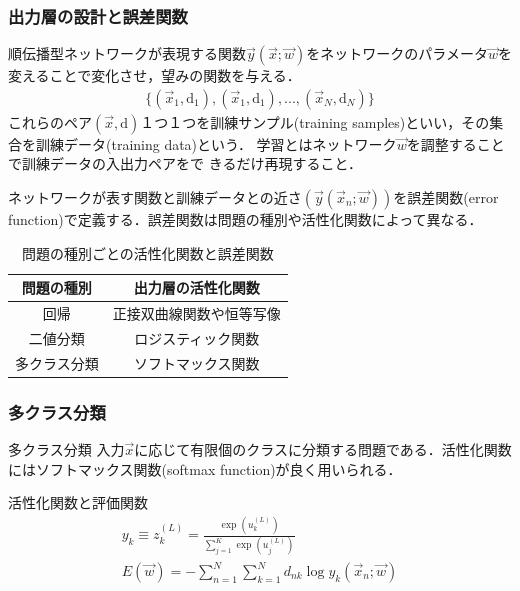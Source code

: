 \documentclass[dvipdfmx,11pt,notheorems]{beamer}
\theoremstyle{definition}
\begin{document}
\begin{frame}[fragile]\frametitle{出力層の設計と誤差関数}

順伝播型ネットワークが表現する関数$\vec{y}(\vec{x};\vec{w})$をネットワークのパラメータ$\vec{w}$を変えることで変化させ，望みの関数を与える．
\begin{eqnarray}
 \{(\vec{x}_{1},\mathrm{d}_{1}),(\vec{x}_{1},\mathrm{d}_{1}),...,(\vec{x}_{N},\mathrm{d}_{N})\}
\end{eqnarray}
これらのペア$(\vec{x},\mathrm{d})$１つ１つを訓練サンプル(training samples)といい，その集合を訓練データ(training data)という．
学習とはネットワーク$\vec{w}$を調整することで訓練データの入出力ペアをで
 きるだけ再現すること．

ネットワークが表す関数と訓練データとの近さ$(\vec{y}(\vec{x}_{n};\vec{w}))$を誤差関数(error function)で定義する．誤差関数は問題の種別や活性化関数によって異なる．

\begin{table}[htb]
\centering
\caption{問題の種別ごとの活性化関数と誤差関数}
\label{000718_27Jun15}
\begin{tabular}[bt]{|c|c|}\hline
 問題の種別 & 出力層の活性化関数 \\ \hline \hline
 回帰 & 正接双曲線関数や恒等写像\\
 二値分類 & ロジスティック関数\\
 多クラス分類 & ソフトマックス関数\\ \hline
\end{tabular}
\end{table}
\end{frame}


\begin{frame}[fragile]\frametitle{多クラス分類}
\begin{block}{多クラス分類}
入力$\vec{x}$に応じて有限個のクラスに分類する問題である．活性化関数にはソフトマックス関数(softmax function)が良く用いられる．
\end{block}
\begin{exampleblock}{活性化関数と評価関数}
\begin{eqnarray}
 y_{k} \equiv z_{k}^{(L)}= \frac{\exp(u_{k}^{(L)})}{\sum^{K}_{j=1}\exp(u_{j}^{(L)})} \\
E(\vec{w})=-\sum^{N}_{n=1}\sum^{N}_{k=1}d_{nk}\log y_{k}(\vec{x}_{n};\vec{w})\label{000700_27Jun15}
\end{eqnarray}
\vspace{0.1cm}
\end{exampleblock}
\end{frame}
\end{document}
